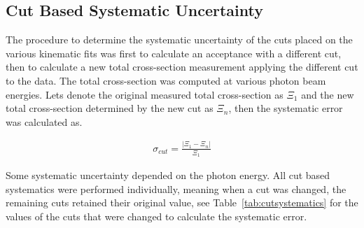  \subsection{Cut Based Systematic Uncertainty}
	 The procedure to determine the systematic uncertainty of the cuts placed on the various kinematic fits was first to calculate an acceptance with a different cut, then to calculate a new total cross-section measurement applying the different cut to the data. The total cross-section was computed at various photon beam energies. Lets denote the original measured total cross-section as $\Xi_1$ and the new total cross-section determined by the new cut as $\Xi_n$, then the systematic error was calculated as.
 	
 	\begin{align}
 		\sigma_{cut} = \frac{\left| \Xi_1 - \Xi_n \right|}{\Xi_1}
 	\end{align}
 	
 	Some systematic uncertainty depended on the photon energy. All cut based systematics were performed individually, meaning when a cut was changed, the remaining cuts retained their original value, see Table~\ref{tab:cutsystematics} for the values of the cuts that were changed to calculate the systematic error.
 	
% 	
%